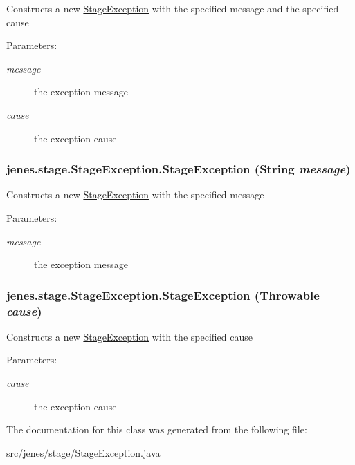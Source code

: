 Constructs a new \hyperlink{classjenes_1_1stage_1_1_stage_exception}{StageException} with the specified message and the specified cause 

\begin{Desc}
\item[Parameters:]
\begin{description}
\item[{\em message}]the exception message \item[{\em cause}]the exception cause \end{description}
\end{Desc}
\hypertarget{classjenes_1_1stage_1_1_stage_exception_ff6f4c1b58696d6e0aae42eaa78c3506}{
\subsubsection[StageException]{\setlength{\rightskip}{0pt plus 5cm}jenes.stage.StageException.StageException (String {\em message})}}
\label{classjenes_1_1stage_1_1_stage_exception_ff6f4c1b58696d6e0aae42eaa78c3506}


Constructs a new \hyperlink{classjenes_1_1stage_1_1_stage_exception}{StageException} with the specified message 

\begin{Desc}
\item[Parameters:]
\begin{description}
\item[{\em message}]the exception message \end{description}
\end{Desc}
\hypertarget{classjenes_1_1stage_1_1_stage_exception_b95390b5a08e2fe49d3f354204390710}{
\subsubsection[StageException]{\setlength{\rightskip}{0pt plus 5cm}jenes.stage.StageException.StageException (Throwable {\em cause})}}
\label{classjenes_1_1stage_1_1_stage_exception_b95390b5a08e2fe49d3f354204390710}


Constructs a new \hyperlink{classjenes_1_1stage_1_1_stage_exception}{StageException} with the specified cause 

\begin{Desc}
\item[Parameters:]
\begin{description}
\item[{\em cause}]the exception cause \end{description}
\end{Desc}


The documentation for this class was generated from the following file:\begin{CompactItemize}
\item 
src/jenes/stage/StageException.java\end{CompactItemize}
